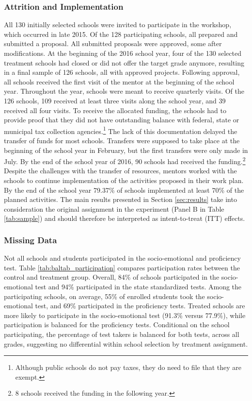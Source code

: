 \documentclass[11pt,a4paper]{article}
\begin{document}
	\subsubsection*{Attrition and Implementation}
	All 130 initially selected schools were invited to participate in the workshop, which occurred in late 2015. Of the 128 participating schools, all prepared and submitted a proposal. All submitted proposals were approved, some after modifications. At the beginning of the 2016 school year, four of the 130 selected treatment schools had closed or did not offer the target grade anymore, resulting in a final sample of 126 schools, all with approved projects.  Following approval, all schools received the first visit of the mentor at the beginning of the school year. Throughout the year, schools were meant to receive quarterly visits. Of the 126 schools, 109 received at least three visits along the school year, and 39 received all four visits. To receive the allocated funding, the schools had to provide proof that they did not have outstanding balance with federal, state or municipal tax collection agencies.\footnote{Although public schools do not pay taxes, they do need to file that they are exempt.} The lack of this documentation delayed the transfer of funds for most schools. Transfers were supposed to take place at the beginning of the school year in February, but the first transfers were only made in July. By the end of the school year of 2016, 90 schools had received the funding.\footnote{8 schools received the funding in the following year.} Despite the challenges with the transfer of resources, mentors worked with the schools to continue implementation of the activities proposed in their work plan. By the end of the school year 79.37\% of schools implemented at least 70\% of the planned activities. The main results presented in Section \ref{sec:results} take into consideration the original assignment in the experiment (Panel B in Table \ref{tab:sample}) and should therefore be interpreted as intent-to-treat (ITT) effects.
	
	\subsubsection*{Missing Data}
	Not all schools and students participated in the socio-emotional and proficiency test. Table \ref{tab:baltab_participation} compares participation rates between the control and treatment group. Overall, 84\% of schools participated in the socio-emotional test and 94\% participated in the state standardized tests. Among the participating schools, on average, 55\% of enrolled students took the socio-emotional test, and 69\% participated in the proficiency tests. Treated schools are more likely to participate in the socio-emotional test (91.3\% versus 77.9\%), while participation is balanced for the proficiency tests. Conditional on the school participating, the percentage of test takers is balanced for both tests, across all grades, suggesting no differential within school selection by treatment assignment. 
	
\end{document}
